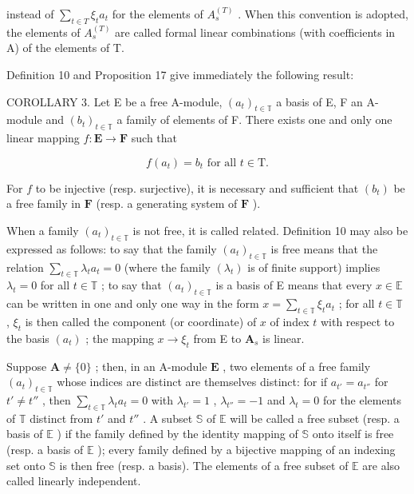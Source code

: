 instead of \(\sum_{t\in T}\xi_{t}a_{t}\) for the elements of \(A_{s}^{(T)}\) . When this convention is adopted, the elements of \(A_{s}^{(T)}\) are called formal linear combinations (with coefficients in A) of the elements of T.

Definition 10 and Proposition 17 give immediately the following result:

COROLLARY 3. Let E be a free A-module, \((a_{t})_{t\in \mathbb{T}}\) a basis of E, F an A-module and \((b_{t})_{t\in \mathbb{T}}\) a family of elements of F. There exists one and only one linear mapping \(f:\mathbf{E}\to \mathbf{F}\) such that

\[
f (a _ {t}) = b _ {t} \text {   for   all   } t \in \mathrm{T}.\tag{45}
\]

For \(f\) to be injective (resp. surjective), it is necessary and sufficient that \((b_t)\) be a free family in \(\mathbf{F}\) (resp. a generating system of \(\mathbf{F}\) ).

When a family \((a_{t})_{t\in \mathbb{T}}\) is not free, it is called related. Definition 10 may also be expressed as follows: to say that the family \((a_{t})_{t\in \mathbb{T}}\) is free means that the relation \(\sum_{t\in \mathbb{T}}\lambda_t a_t = 0\) (where the family \((\lambda_t)\) is of finite support) implies \(\lambda_{t} = 0\) for all \(t\in \mathbb{T}\) ; to say that \((a_{t})_{t\in \mathbb{T}}\) is a basis of E means that every \(x\in \mathbb{E}\) can be written in one and only one way in the form \(x = \sum_{t\in \mathbb{T}}\xi_t a_t\) ; for all \(t\in \mathbb{T}\) , \(\xi_{t}\) is then called the component (or coordinate) of \(x\) of index \(t\) with respect to the basis \((a_{t})\) ; the mapping \(x\to \xi_t\) from E to \(\mathbf{A}_s\) is linear.

Suppose \(\mathbf{A} \neq \{0\}\) ; then, in an A-module \(\mathbf{E}\) , two elements of a free family \((a_t)_{t \in \mathbb{T}}\) whose indices are distinct are themselves distinct: for if \(a_{t'} = a_{t''}\) for \(t' \neq t''\) , then \(\sum_{t \in \mathbb{T}} \lambda_t a_t = 0\) with \(\lambda_{t'} = 1\) , \(\lambda_{t''} = -1\) and \(\lambda_t = 0\) for the elements of \(\mathbb{T}\) distinct from \(t'\) and \(t''\) . A subset \(\mathbb{S}\) of \(\mathbb{E}\) will be called a free subset (resp. a basis of \(\mathbb{E}\) ) if the family defined by the identity mapping of \(\mathbb{S}\) onto itself is free (resp. a basis of \(\mathbb{E}\) ); every family defined by a bijective mapping of an indexing set onto \(\mathbb{S}\) is then free (resp. a basis). The elements of a free subset of \(\mathbb{E}\) are also called linearly independent.

